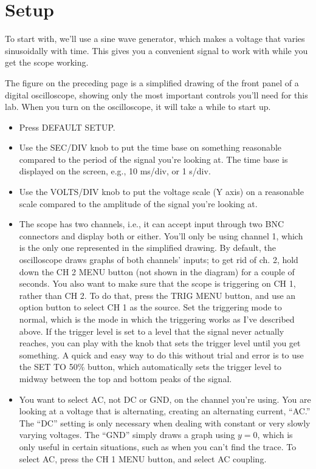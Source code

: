 \section*{Setup}


To start with, we'll use a sine wave generator, which makes
a voltage that varies sinusoidally with time. This gives you
a convenient signal to work with while you get the scope working.

The figure on the preceding page is a simplified
drawing of the front panel of a digital oscilloscope, showing
only the most important controls you'll need for this lab.
When you turn on the oscilloscope, it will take a while to start
up.


\begin{itemize}
\item[] Press DEFAULT SETUP.

\item[] Use the SEC/DIV knob to
put the time base on something reasonable compared to the
period of the signal you're looking at. The time base is
displayed on the screen, e.g., 10 ms/div, or 1 s/div.

\item[] Use the VOLTS/DIV knob to
put the voltage scale (Y axis) on a reasonable scale
compared to the amplitude of the signal you're looking at.

\item[] The scope has two channels, i.e., it can accept input
through two BNC connectors and display both or either. You'll
only be using channel 1, which is the only one represented in
the simplified drawing. By default, the oscilloscope draws
graphs of both channels' inputs; to get rid of ch. 2, hold
down the CH 2 MENU button (not shown in the diagram) for a couple
of seconds. You also want to make sure that the scope is triggering
on CH 1, rather than CH 2. To do that, press the TRIG MENU
button, and use an option button to select CH 1 as the source.
Set the triggering mode to normal, which is the mode in which
the triggering works as I've described above.
If the trigger level is set to a level that the signal never
actually reaches, you can play with the knob that sets the trigger
level until you get something. A quick and easy way to do this
without trial and error is to use the SET TO 50\%
button, which
automatically sets the trigger level to midway between the top
and bottom peaks of the signal.

\item[] You want to select AC, not DC or GND, on the channel you're using. You
are looking at a voltage that is alternating, creating an
alternating current, ``AC.'' The ``DC'' setting is only
necessary when dealing with constant or very slowly varying
voltages. The ``GND'' simply draws a graph using $y=0$,
which is only useful in certain situations, such as when you
can't find the trace. To select AC, press the CH 1 MENU
button, and select AC coupling.

\end{itemize}

